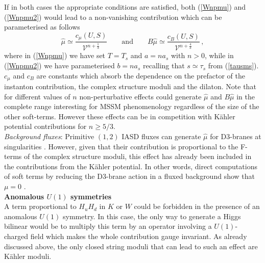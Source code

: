 \documentclass[11pt,a4paper]{article}
\newcommand{\be}{\begin{equation}}
\newcommand{\ee}{\end{equation}}
\newcommand\vo{{\mathcal{V}}}
\begin{document}
If in both cases the appropriate conditions are satisfied, both (\ref{Wnpmu}) and (\ref{Wnpmu2}) would lead to a non-vanishing contribution which can be parameterised as follows
\be
\hat{\mu} \simeq \frac{c_\mu(U,S)}{\vo^{n+\frac 13}}
\qquad\text{and}\qquad
B \hat{\mu} \simeq \frac{c_B(U,S)}{\vo^{n+ \frac 43}}\,,
\label{mumag}
\ee
where in (\ref{Wnpmu}) we have set $T=T_s$ and $a=n a_s$ with $n>0$, while in (\ref{Wnpmu2}) we have parameterised $b=n a_s$
recalling that $s\simeq \tau_s$ from (\ref{tausms}). $c_{\mu}$ and $c_B$ are constants which absorb the dependence on the prefactor of the instanton contribution, the complex structure moduli and the dilaton. Note that for different values of $n$ non-perturbative effects could generate $\hat{\mu}$ and $B \hat{\mu}$ in the complete range interesting for MSSM phenomenology regardless of the size of the other soft-terms.
However these effects can be in competition with K\"ahler potential contributions for $n \geq 5/3$.\\

\emph{Background fluxes}: Primitive $(1,2)$ IASD fluxes
can generate $\hat\mu$ for D3-branes at singularities \cite{Grana:2002nq,Camara:2003ku,Grana:2003ek}.
However, given that their contribution is proportional to the F-terms of the complex structure moduli,
this effect has already been included in the contributions from the K\"ahler potential. In other words, direct computations of soft terms
by reducing the D3-brane action in a fluxed background show that $\mu=0$ \cite{Grana:2003ek}.\\

\noindent \textbf{Anomalous $U(1)$ symmetries}\medskip\\
A term proportional to $H_u H_d$ in $K$ or $W$ could be forbidden in the presence of an anomalous $U(1)$ symmetry.
In this case, the only way to generate a Higgs bilinear would be to multiply this term by an operator involving a $U(1)$-charged field
which makes the whole contribution gauge invariant. As already discussed above, the only closed string moduli that can lead to such an effect are K\"ahler moduli.
\end{document}
